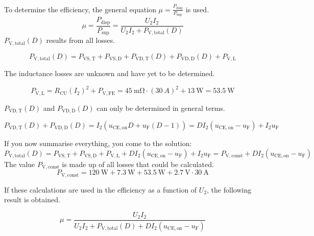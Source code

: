 \begin{solutionblock}
    To determine the efficiency, the general equation $\mu=\frac{P_{\mathrm{disp}}}{P_{\mathrm{sup}}}$ is used.
    \begin{equation}
\mu=\frac{P_{\mathrm{disp}}}{P_{\mathrm{sup}}} = \frac{U_2 I_2}{U_2 I_2 + P_{\mathrm{V,total}}(D)}
    \end{equation}
    $P_{\mathrm{V,total}}(D)$ results from all losses.

    \begin{equation}
P_{\mathrm{V,total}}(D) =  P_{\mathrm{VS,T}} +  P_{\mathrm{VS,D}} + P_{\mathrm{VD,T}}(D) + P_{\mathrm{VD,D}}(D) + P_{\mathrm{V,L}}
\end{equation}

The inductance losses are unknown and have yet to be determined.

\begin{equation}
   P_{\mathrm{V,L}} = R_{\mathrm{CU}} (I_{\mathrm{2}})^2 + P_{\mathrm{V,FE}} = \SI{45}{\mohm} \cdot {(30\ \si{A})^2} + \SI {13}{\watt} = \SI {53.5}{\watt}
    \end{equation}

    $P_{\mathrm{VD,T}}(D)$ and $P_{\mathrm{VD,D}}(D)$ can only be determined in general terms.

    \begin{equation}
P_{\mathrm{VD,T}}(D) + P_{\mathrm{VD,D}}(D) = I_2( u_{\mathrm{CE,on}} D + u_{\mathrm{F}}(D-1)) = D I_2(u_{\mathrm{CE,on}} - u_{\mathrm{F}} ) + I_2 u_{\mathrm{F}}
    \end{equation}

    If you now summarise everything, you come to the solution:
    \begin{equation}
    P_{\mathrm{V,total}}(D) = P_{\mathrm{VS,T}} +  P_{\mathrm{VS,D}} + P_{\mathrm{V,L}} + D I_2(u_{\mathrm{CE,on}} - u_{\mathrm{F}} ) + I_2 u_{\mathrm{F}} =  P_{\mathrm{V,const}} + D I_2 (u_{\mathrm{CE,on}} - u_{\mathrm{F}})
\end{equation}
The value $P_{\mathrm{V,const}}$ is made up of all losses that could be calculated.
\begin{equation}
    P_{\mathrm{V,const}} = \SI {120}{\watt} + \SI {7.3}{\watt} +\SI {53.5}{\watt} + \SI {2.7}{\volt}\cdot\SI {30}{\ampere}
\end{equation}

If these calculations are used in the efficiency as a function of $U_2$, the following result is obtained.

\begin{equation}
    \mu= \frac{U_2 I_2}{U_2 I_2 + P_{\mathrm{V,total}}(D)+D I_2 (u_{\mathrm{CE,on}} - u_{\mathrm{F}})}
\end{equation}
\end{solutionblock}

